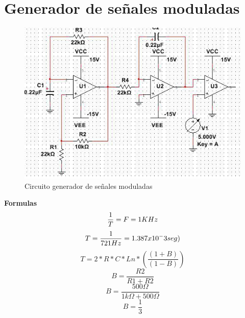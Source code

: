 \documentclass[12pt,a4paper]{article}
\begin{document}
\section{Generador de señales moduladas}
\begin{figure}[hbtp]
\centering
\includegraphics[scale=0.6]{Pictures/Generador.PNG}
\caption{Circuito generador de señales moduladas}
\end{figure}
\textbf{Formulas}
\begin{equation}
\frac{1}{T} = F = 1KHz\\
\end{equation}
\begin{equation}
T= \frac{1}{721Hz}= 1.387x10^-3 seg)\\
\end{equation}
\begin{equation}
T= 2 * R * C * Ln * (\frac{(1+B)}{(1-B)})
\end{equation}
\begin{equation}
B= \frac{R2}{R1+R2}
\end{equation}
\begin{equation}
B= \frac{500\Omega}{1k\Omega + 500\Omega}
\end{equation}
\begin{equation}
B= \frac{1}{3}
\end{equation}
\end{document}
